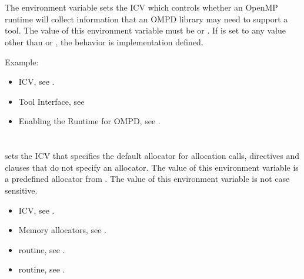 \section{}
\label{sec:OMP_DEBUG}

The  environment variable sets the
 ICV which controls whether an OpenMP runtime
will collect information that an OMPD library may need to support
a tool.
The value of this environment variable must be 
or .
If  is set to any value other than 
or , the behavior is implementation defined.

Example:
\begin{ompEnv}
\end{ompEnv}

\crossreferences
\begin{itemize}
\item {} ICV,
see .
\item Tool Interface, see 
\item Enabling the Runtime for OMPD, see .
\end{itemize}


\section{}
\label{sec:OMP_ALLOCATOR}

 sets the  ICV that specifies the default
allocator for allocation calls, directives and clauses that do not specify an allocator.
The value of this environment variable is a predefined allocator from . The value of this environment variable is not case sensitive.

\crossreferences
\begin{itemize}
\item {} ICV, see .

\item Memory allocators, see .

\item {} routine, see .

\item {} routine, see .
\end{itemize}



